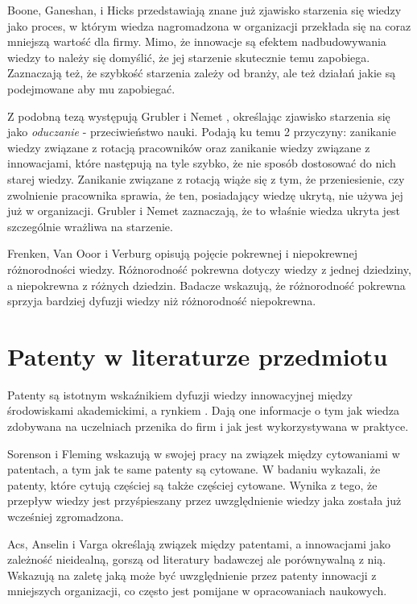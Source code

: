 Boone, Ganeshan, i Hicks \cite{Bo-Ga-Hi-08} przedstawiają znane już zjawisko
starzenia się wiedzy jako proces, w którym wiedza nagromadzona
w organizacji przekłada się na coraz mniejszą wartość dla firmy.
Mimo, że innowacje są efektem nadbudowywania wiedzy to należy
się domyślić, że jej starzenie skutecznie temu zapobiega. 
Zaznaczają też, że szybkość starzenia zależy od branży, ale też
działań jakie są podejmowane aby mu zapobiegać.

Z podobną tezą występują Grubler i Nemet \cite{Gr-Ne-13}, określając
zjawisko starzenia się jako \textit{oduczanie} - przeciwieństwo nauki.
Podają ku temu 2 przyczyny: zanikanie wiedzy związane z rotacją
pracowników oraz zanikanie wiedzy związane z innowacjami, które
następują na tyle szybko, że nie sposób dostosować do nich starej
wiedzy. Zanikanie związane z rotacją wiąże się z tym, że
przeniesienie, czy zwolnienie pracownika sprawia, że ten,
posiadający wiedzę ukrytą, nie używa jej już w organizacji.
Grubler i Nemet zaznaczają, że to właśnie wiedza ukryta jest
szczególnie wrażliwa na starzenie.

Frenken, Van Ooor i Verburg \cite{Fr-Oo-Ve-07} opisują pojęcie pokrewnej i
niepokrewnej różnorodności wiedzy. Różnorodność pokrewna dotyczy
wiedzy z jednej dziedziny, a niepokrewna z różnych dziedzin.
Badacze wskazują, że różnorodność pokrewna sprzyja bardziej
dyfuzji wiedzy niż różnorodność niepokrewna.



\section{Patenty w literaturze przedmiotu}

Patenty są istotnym wskaźnikiem dyfuzji wiedzy innowacyjnej
między środowiskami akademickimi, a rynkiem \cite{Lo-Br-08}.
Dają one informacje o tym jak wiedza zdobywana na uczelniach
przenika do firm i jak jest wykorzystywana w praktyce.

Sorenson i Fleming \cite{So-Fl-04} wskazują w swojej pracy na związek
między cytowaniami w patentach, a tym jak te same patenty są
cytowane. W badaniu wykazali, że patenty, które cytują częściej
są także częściej cytowane. Wynika z tego, że przepływ wiedzy
jest przyśpieszany przez uwzględnienie wiedzy jaka została
już wcześniej zgromadzona.

Acs, Anselin i Varga \cite{Ac-An-Va-02} określają związek między patentami,
a innowacjami jako zależność nieidealną, gorszą od literatury
badawczej ale porównywalną z nią. Wskazują na zaletę jaką może
być uwzględnienie przez patenty innowacji z mniejszych organizacji,
co często jest pomijane w opracowaniach naukowych.

